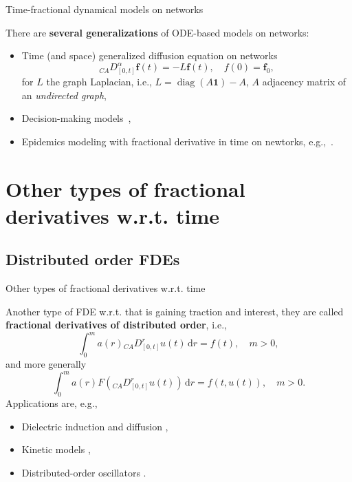 \documentclass[aspectratio=169,xcolor=dvipsnames]{beamer}
\begin{document}
\begin{frame}{Time-fractional dynamical models on networks}

There are \textbf{several generalizations} of ODE-based models on networks:

\begin{itemize}
	\item[\faFile] Time (and space) generalized diffusion equation on networks~\parencite{DIAZDIAZ2022111791}
	\[
	{}_{CA} D^{\alpha}_{[0,t]}\mathbf{f}(t) = - L \mathbf{f}(t), \quad f(0) = \mathbf{f}_0,
	\]
	for $L$ the \alert{graph Laplacian}, i.e., $L = \operatorname{diag}(A\mathbf{1}) - A$, $A$ adjacency matrix of
	an \emph{undirected graph},
	\item[\faFile] Decision-making models~\parencite{West_2015},
	\item[\faFile] Epidemics modeling with fractional derivative in time on newtorks, e.g.,~\parencite{HUO201641}.
\end{itemize}


\end{frame}

\section{Other types of fractional derivatives w.r.t. time}

\subsection{Distributed order FDEs}

\begin{frame}{Other types of fractional derivatives w.r.t. time}

Another type of FDE w.r.t. that is gaining traction and interest, they are called \textbf{fractional derivatives of distributed order}, i.e.,
\[
\int_{0}^{m} a(r) {}_{CA}D_{[0,t]}^r u(t)\,\mathrm{d}r = f(t), \quad m > 0,
\]
and more generally 
\[
\int_{0}^{m} a(r) F\left( {}_{CA}D_{[0,t]}^r u(t) \right)\,\mathrm{d}r = f(t,u(t)), \quad m > 0.
\]
Applications are, e.g.,
\begin{itemize}
\item[\faFile] Dielectric induction and diffusion \parencite{MR1874477},
\item[\faFile] Kinetic models \parencite{sokolov2004distributed},
\item[\faFile] Distributed-order oscillators \parencite{MR2167221}.
\end{itemize}
\end{frame}
\end{document}
